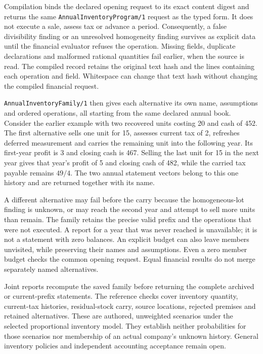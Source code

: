 Compilation binds the declared opening request to its exact content digest and
returns the same \texttt{Annual\allowbreak{}Inventory\allowbreak{}Program/1} request as the typed form.
It does not execute a sale, assess tax or advance a period.  Consequently, a
false divisibility finding or an unresolved homogeneity finding survives as
explicit data until the financial evaluator refuses the operation.  Missing
fields, duplicate declarations and malformed rational quantities fail earlier,
when the source is read.  The compiled record retains the original text hash
and the lines containing each operation and field.  Whitespace can change
that text hash without changing the compiled financial request.

\texttt{Annual\allowbreak{}Inventory\allowbreak{}Family/1} then gives each alternative its own name,
assumptions and ordered operations, all starting from the same declared annual
book.  Consider the earlier example with two recovered units costing 20 and
cash of 452.  The first alternative sells one unit for 15, assesses current tax
of 2, refreshes deferred measurement and carries the remaining unit into the
following year.  Its first-year profit is 3 and closing cash is 467.  Selling the
last unit for 15 in the next year gives that year's profit of 5 and closing cash
of 482, while the carried tax payable remains \(49/4\).  The two annual statement
vectors belong to this one history and are returned together with its name.

A different alternative may fail before the carry because the homogeneous-lot
finding is unknown, or may reach the second year and attempt to sell more units
than remain.  The family retains the precise valid prefix and the operations
that were not executed.  A report for a year that was never reached is
unavailable; it is not a statement with zero balances.  An explicit budget can
also leave members unvisited, while preserving their names and assumptions.
Even a zero member budget checks the common opening request.  Equal financial
results do not merge separately named alternatives.

Joint reports recompute the saved family before returning the complete archived
or current-prefix statements.  The reference checks cover inventory quantity,
current-tax histories, residual-stock carry, source locations, rejected premises
and retained alternatives.  These are authored, unweighted scenarios under the
selected proportional inventory model.  They establish neither probabilities
for those scenarios nor membership of an actual company's unknown history.
General inventory policies and independent accounting acceptance remain open.


